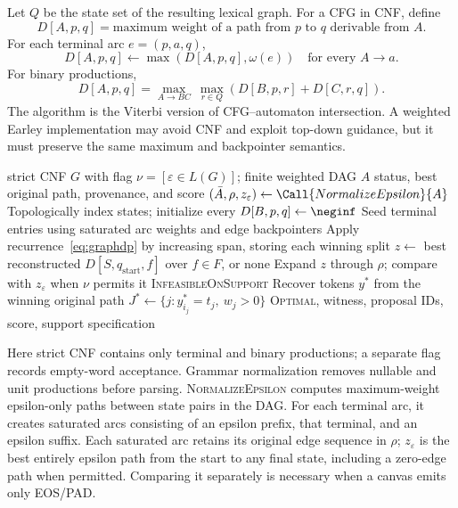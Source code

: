 Let $Q$ be the state set of the resulting lexical graph. For a CFG in CNF, define
\begin{equation}
D[A,p,q]=\text{maximum weight of a path from $p$ to $q$ derivable from $A$}.
\end{equation}
For each terminal arc $e=(p,a,q)$,
\begin{equation}
D[A,p,q]\gets\max(D[A,p,q],\omega(e))
\quad\text{for every }A\rightarrow a.
\end{equation}
For binary productions,
\begin{equation}
D[A,p,q]=
\max_{A\rightarrow BC}\ \max_{r\in Q}
\left(D[B,p,r]+D[C,r,q]\right).
\label{eq:graphdp}
\end{equation}
The algorithm is the Viterbi version of CFG--automaton intersection. A weighted Earley implementation may avoid CNF and exploit top-down guidance, but it must preserve the same maximum and backpointer semantics.

\begin{algorithm}[ht]
\caption{Max-plus parsing over a finite lattice}
\label{alg:graph}
\footnotesize
\begin{algorithmic}[1]
\Require strict CNF $G$ with flag $\nu=[\varepsilon\in L(G)]$; finite weighted DAG $A$
\Ensure status, best original path, provenance, and score
\State $(\bar A,\rho,z_\varepsilon)\gets\Call{NormalizeEpsilon}{A}$ 
\State Topologically index states; initialize every $D[B,p,q]\gets\neginf$
\State Seed terminal entries using saturated arc weights and edge backpointers
\State Apply recurrence~\eqref{eq:graphdp} by increasing span, storing each winning split
\State $z\gets$ best reconstructed $D[S,q_{\mathrm{start}},f]$ over $f\in F$, or none
\State Expand $z$ through $\rho$; compare with $z_\varepsilon$ when $\nu$ permits it
 \State \Return \textsc{InfeasibleOnSupport} \EndIf
\State Recover tokens $y^*$ from the winning original path
\State $J^*\gets\{j:y^*_{i_j}=t_j,\ w_j>0\}$
\State \Return \textsc{Optimal}, witness, proposal IDs, score, support specification
\end{algorithmic}
\end{algorithm}

Here strict CNF contains only terminal and binary productions; a separate flag records empty-word acceptance. Grammar normalization removes nullable and unit productions before parsing. \textsc{NormalizeEpsilon} computes maximum-weight epsilon-only paths between state pairs in the DAG. For each terminal arc, it creates saturated arcs consisting of an epsilon prefix, that terminal, and an epsilon suffix. Each saturated arc retains its original edge sequence in $\rho$; $z_\varepsilon$ is the best entirely epsilon path from the start to any final state, including a zero-edge path when permitted. Comparing it separately is necessary when a canvas emits only EOS/PAD.

